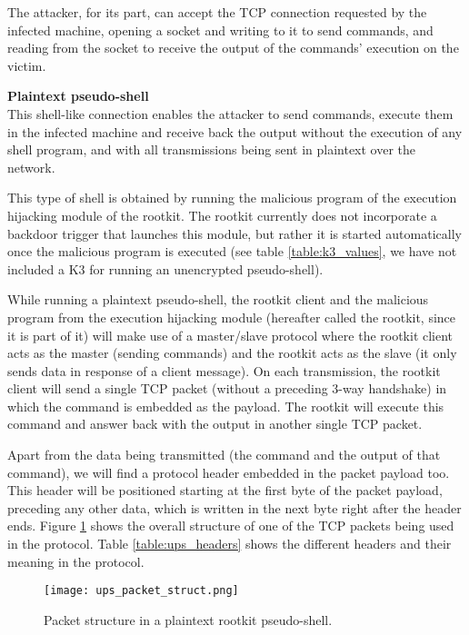 The attacker, for its part, can accept the TCP connection requested by the infected machine, opening a socket and writing to it to send commands, and reading from the socket to receive the output of the commands' execution on the victim.
 
 
 
\textbf{Plaintext pseudo-shell}\\
This shell-like connection enables the attacker to send commands, execute them in the infected machine and receive back the output without the execution of any shell program, and with all transmissions being sent in plaintext over the network.

This type of shell is obtained by running the malicious program of the execution hijacking module of the rootkit. The rootkit currently does not incorporate a backdoor trigger that launches this module, but rather it is started automatically once the malicious program is executed (see table \ref{table:k3_values}, we have not included a K3 for running an unencrypted pseudo-shell).

While running a plaintext pseudo-shell, the rootkit client and the malicious program from the execution hijacking module (hereafter called the rootkit, since it is part of it) will make use of a master/slave protocol where the rootkit client acts as the master (sending commands) and the rootkit acts as the slave (it only sends data in response of a client message). On each transmission, the rootkit client will send a single TCP packet (without a preceding 3-way handshake) in which the command is embedded as the payload. The rootkit will execute this command and answer back with the output in another single TCP packet.

Apart from the data being transmitted (the command and the output of that command), we will find a protocol header embedded in the packet payload too. This header will be positioned starting at the first byte of the packet payload, preceding any other data, which is written in the next byte right after the header ends. Figure \ref{fig:ups_packet_struct} shows the overall structure of one of the TCP packets being used in the protocol. Table \ref{table:ups_headers} shows the different headers and their meaning in the protocol.

\begin{figure}[htbp]
	\centering
	\texttt{[image: ups\_packet\_struct.png]}
	\caption{Packet structure in a plaintext rootkit pseudo-shell.}
	\label{fig:ups_packet_struct}
\end{figure}

